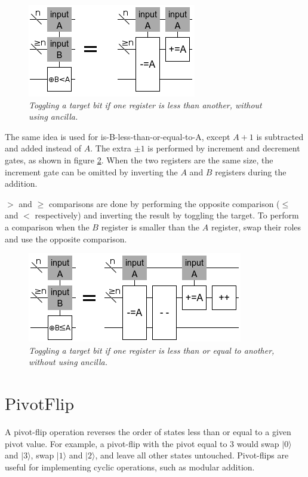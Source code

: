 \documentclass[twocolumn]{article}
\begin{document}
\begin{figure}
  \centering
  \includegraphics[totalheight=3cm]{comparison-less.png}
  \caption{\em Toggling a target bit if one register is less than another, without using ancilla.}
  \label{fig:comparison-less}
\end{figure}

The same idea is used for is-B-less-than-or-equal-to-A, except $A+1$ is subtracted and added instead of $A$.
The extra $\pm 1$ is performed by increment and decrement gates, as shown in figure \ref{fig:comparison-leq}.
When the two registers are the same size, the increment gate can be omitted by inverting the $A$ and $B$ registers during the addition.

$>$ and $\geq$ comparisons are done by performing the opposite comparison ($\leq$ and $<$ respectively) and inverting the result by toggling the target.
To perform a comparison when the $B$ register is smaller than the $A$ register, swap their roles and use the opposite comparison.

\begin{figure}
  \centering
  \includegraphics[totalheight=3cm]{comparison-leq.png}
  \caption{\em Toggling a target bit if one register is less than or equal to another, without using ancilla.}
  \label{fig:comparison-leq}
\end{figure}

\section{$\text{PivotFlip}$}

A pivot-flip operation reverses the order of states less than or equal to a given pivot value.
For example, a pivot-flip with the pivot equal to 3 would swap $|0\rangle$ and $|3\rangle$, swap $|1\rangle$ and $|2\rangle$, and leave all other states untouched.
Pivot-flips are useful for implementing cyclic operations, such as modular addition.
\end{document}

